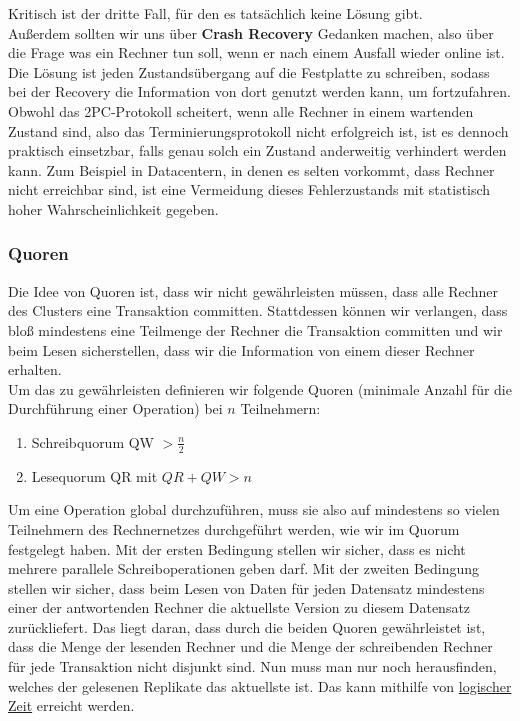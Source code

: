 Kritisch ist der dritte Fall, für den es tatsächlich keine Lösung gibt.\\

Außerdem sollten wir uns über \textbf{Crash Recovery} Gedanken machen, also über die Frage was ein Rechner tun soll, wenn er nach einem Ausfall wieder online ist. Die Lösung ist jeden Zustandsübergang auf die Festplatte zu schreiben, sodass bei der Recovery die Information von dort genutzt werden kann, um fortzufahren.\\

Obwohl das 2PC-Protokoll scheitert, wenn alle Rechner in einem wartenden Zustand sind, also das Terminierungsprotokoll nicht erfolgreich ist, ist es dennoch praktisch einsetzbar, falls genau solch ein Zustand anderweitig verhindert werden kann. Zum Beispiel in Datacentern, in denen es selten vorkommt, dass Rechner nicht erreichbar sind, ist eine Vermeidung dieses Fehlerzustands mit statistisch hoher Wahrscheinlichkeit gegeben.

\subsubsection{Quoren}
\label{sec:quorums}

Die Idee von Quoren ist, dass wir nicht gewährleisten müssen, dass alle Rechner des Clusters eine Transaktion committen. Stattdessen können wir verlangen, dass bloß mindestens eine Teilmenge der Rechner die Transaktion committen und wir beim Lesen sicherstellen, dass wir die Information von einem dieser Rechner erhalten.\\

Um das zu gewährleisten definieren wir folgende Quoren (minimale Anzahl für die Durchführung einer Operation) bei $n$ Teilnehmern:
\begin{enumerate}
      \item Schreibquorum QW $> \frac{n}{2}$
      \item Lesequorum QR mit $QR + QW > n$
\end{enumerate}

Um eine Operation global durchzuführen, muss sie also auf mindestens so vielen Teilnehmern des Rechnernetzes durchgeführt werden, wie wir im Quorum festgelegt haben. Mit der ersten Bedingung stellen wir sicher, dass es nicht mehrere parallele Schreiboperationen geben darf. Mit der zweiten Bedingung stellen wir sicher, dass beim Lesen von Daten für jeden Datensatz mindestens einer der antwortenden Rechner die aktuellste Version zu diesem Datensatz zurückliefert. Das liegt daran, dass durch die beiden Quoren gewährleistet ist, dass die Menge der lesenden Rechner und die Menge der schreibenden Rechner für jede Transaktion nicht disjunkt sind. Nun muss man nur noch herausfinden, welches der gelesenen Replikate das aktuellste ist. Das kann mithilfe von \hyperref[sec:logic-time]{logischer Zeit} erreicht werden.\\

